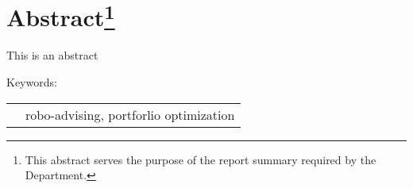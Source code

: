 \chapter*{Abstract\footnote{This abstract serves the purpose of the report summary required by the Department.}}

This is an abstract

\bigskip

\noindent Keywords:

\begin{table}[H]
    \begin{tabular}{ll}
        \hspace*{0.5cm} & robo-advising, portforlio optimization\\
    \end{tabular}
\end{table}